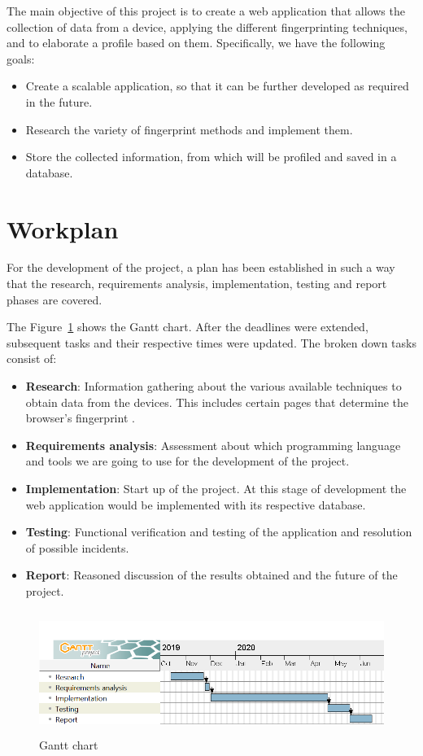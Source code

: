 The main objective of this project is to create a web application that allows the collection of data from a device, applying the different fingerprinting techniques, and to elaborate a profile based on them. Specifically, we have the following goals:
\begin{itemize}
	\item Create a scalable application, so that it can be further developed as required in the future.
	\item Research the variety of fingerprint methods and implement them.
	\item Store the collected information, from which will be profiled and saved in a database.
\end{itemize}

\section{Workplan}
For the development of the project, a plan has been established in such a way that the research, requirements analysis, implementation, testing and report phases are covered. \par
The Figure~\ref{fig:diagramaGantten} shows the Gantt chart. After the deadlines were extended, subsequent tasks and their respective times were updated. The broken down tasks consist of:
\begin{itemize}
	\item \textbf{Research}: Information gathering about the various available techniques to obtain data from the devices. This includes certain pages that determine the browser's fingerprint \cite{amiunique}.
	\item \textbf{Requirements analysis}: Assessment about which programming language and tools we are going to use for the development of the project.
	\item \textbf{Implementation}: Start up of the project. At this stage of development the web application would be implemented with its respective database.
	\item \textbf{Testing}: Functional verification and testing of the application and resolution of possible incidents.
	\item \textbf{Report}: Reasoned discussion of the results obtained and the future of the project.
\end{itemize}
\begin{figure}[b]
	\includegraphics[width=1\textwidth, height=4cm]{Images/diagramaGantten.png}
	\caption{Gantt chart}
	\label{fig:diagramaGantten}
\end{figure}

